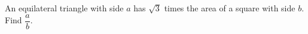 An equilateral triangle with side $a$ has $\sqrt3$ times the area of a square with side $b$. Find $\dfrac ab$.
